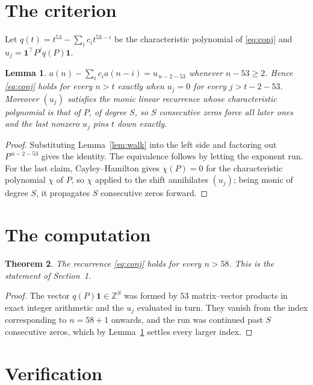 \documentclass[11pt,a4paper]{article}
\theoremstyle{plain}
\newtheorem{theorem}{Theorem}
\newtheorem{lemma}[theorem]{Lemma}
\theoremstyle{definition}
\begin{document}
\section{The criterion}

Let $q(t)=t^{53}-\sum_i c_i t^{53-i}$ be the characteristic polynomial of
\eqref{eq:conj} and $u_j=\mathbf{1}^{\!\top}P^{j}q(P)\mathbf{1}$.

\begin{lemma}\label{lem:crit}
$a(n)-\sum_i c_i a(n-i)=u_{\,n-2-53}$ whenever $n-53\ge2$. Hence
\eqref{eq:conj} holds for every $n>t$ exactly when $u_j=0$ for every
$j>t-2-53$. Moreover $(u_j)$ satisfies the monic linear recurrence whose
characteristic polynomial is that of $P$, of degree $S$, so $S$ consecutive zeros force all
later ones and the last nonzero $u_j$ pins $t$ down exactly.
\end{lemma}

\begin{proof}
Substituting Lemma~\ref{lem:walk} into the left side and factoring out
$P^{\,n-2-53}$ gives the identity. The equivalence follows by letting the exponent
run. For the last claim, Cayley--Hamilton gives $\chi(P)=0$ for the characteristic
polynomial $\chi$ of $P$, so $\chi$ applied to the shift annihilates $(u_j)$; being monic of
degree $S$, it propagates $S$ consecutive zeros forward.
\end{proof}

\section{The computation}

\begin{theorem}
The recurrence \eqref{eq:conj} holds for every $n>58$. This is the statement of
Section~1.
\end{theorem}

\begin{proof}
The vector $q(P)\mathbf{1}\in\mathbb{Z}^{S}$ was formed by $53$ matrix--vector
products in exact integer arithmetic and the $u_j$ evaluated in turn. They vanish from the
index corresponding to $n=58+1$ onwards, and the run was continued past $S$ consecutive
zeros, which by Lemma~\ref{lem:crit} settles every larger index.
\end{proof}

\section{Verification}
\end{document}
